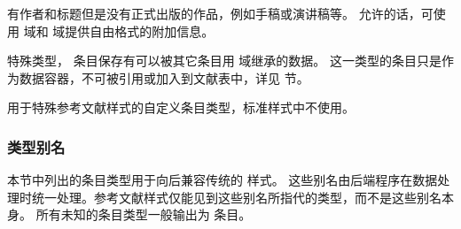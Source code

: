 \begin{typelist}


有作者和标题但是没有正式出版的作品，例如手稿或演讲稿等。
允许的话，可使用  域和  域提供自由格式的附加信息。




特殊类型， 条目保存有可以被其它条目用  域继承的数据。
这一类型的条目只是作为数据容器，不可被引用或加入到文献表中，详见 节。



用于特殊参考文献样式的自定义条目类型，标准样式中不使用。

\end{typelist}

\subsubsection{类型别名}
\label{bib:typ:als}


本节中列出的条目类型用于向后兼容传统的 \BibTeX 样式。
这些别名由后端程序在数据处理时统一处理。参考文献样式仅能见到这些别名所指代的类型，而不是这些别名本身。
所有未知的条目类型一般输出为  条目。

